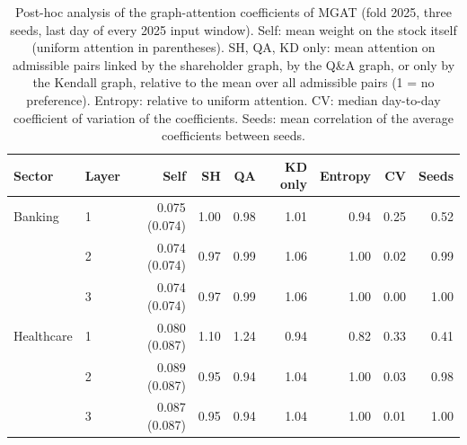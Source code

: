 \documentclass[pdflatex,sn-mathphys-num]{sn-jnl}%
\theoremstyle{thmstyleone}%
\theoremstyle{thmstyletwo}%
\theoremstyle{thmstylethree}%
\begin{document}
\begin{table}[!t]\centering\small\color{blue}
\caption{Post-hoc analysis of the graph-attention coefficients of MGAT (fold 2025, three seeds, last day of every 2025 input window). Self: mean weight on the stock itself (uniform attention in parentheses). SH, QA, KD only: mean attention on admissible pairs linked by the shareholder graph, by the Q\&A graph, or only by the Kendall graph, relative to the mean over all admissible pairs (1 = no preference). Entropy: relative to uniform attention. CV: median day-to-day coefficient of variation of the coefficients. Seeds: mean correlation of the average coefficients between seeds.}
\label{tab:attention}
\setlength{\tabcolsep}{3pt}
\begin{tabular}{llrrrrrrr}\toprule
Sector & Layer & Self & SH & QA & KD only & Entropy & CV & Seeds \\ \midrule
Banking & 1 & 0.075 (0.074) & 1.00 & 0.98 & 1.01 & 0.94 & 0.25 & 0.52 \\
 & 2 & 0.074 (0.074) & 0.97 & 0.99 & 1.06 & 1.00 & 0.02 & 0.99 \\
 & 3 & 0.074 (0.074) & 0.97 & 0.99 & 1.06 & 1.00 & 0.00 & 1.00 \\
\midrule
Healthcare & 1 & 0.080 (0.087) & 1.10 & 1.24 & 0.94 & 0.82 & 0.33 & 0.41 \\
 & 2 & 0.089 (0.087) & 0.95 & 0.94 & 1.04 & 1.00 & 0.03 & 0.98 \\
 & 3 & 0.087 (0.087) & 0.95 & 0.94 & 1.04 & 1.00 & 0.01 & 1.00 \\
\bottomrule\end{tabular}
\end{table}
\end{document}
